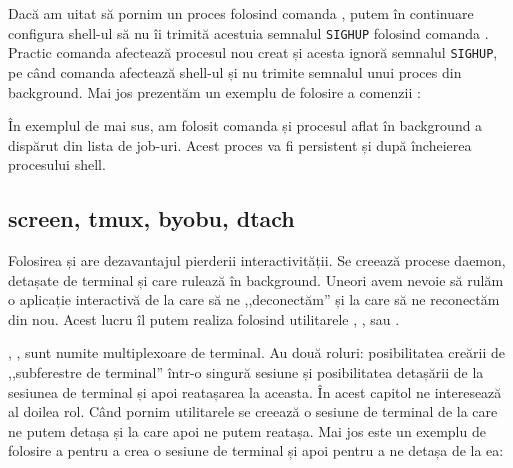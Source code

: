 Dacă am uitat să pornim un proces folosind comanda , putem în continuare
configura shell-ul să nu îi trimită acestuia semnalul \texttt{SIGHUP} folosind comanda
. Practic comanda  afectează procesul nou creat și acesta ignoră
semnalul \texttt{SIGHUP}, pe când comanda  afectează shell-ul și nu trimite
semnalul unui proces din background. Mai jos prezentăm un exemplu de folosire a
comenzii :


În exemplul de mai sus, am folosit comanda  și procesul aflat în background a dispărut din lista de job-uri. Acest proces va fi persistent și după încheierea procesului shell.

\subsection{screen, tmux, byobu, dtach}
\label{sec:procese-interactivitate-screen}

Folosirea  și  are dezavantajul pierderii interactivității. Se
creează procese daemon, detașate de terminal și care rulează în background.
Uneori avem nevoie să rulăm o aplicație interactivă de la care să ne
,,deconectăm'' și la care să ne reconectăm din nou. Acest lucru îl putem realiza
folosind utilitarele , ,  sau .

, ,  sunt numite multiplexoare de terminal. Au două roluri:
posibilitatea creării de ,,subferestre de terminal'' într-o singură sesiune și
posibilitatea detașării de la sesiunea de terminal și apoi reatașarea la
aceasta. În acest capitol ne interesează al doilea rol. Când pornim utilitarele
se creează o sesiune de terminal de la care ne putem detașa și la care apoi ne
putem reatașa. Mai jos este un exemplu de folosire a  pentru a crea o
sesiune de terminal și apoi pentru a ne detașa de la ea:

